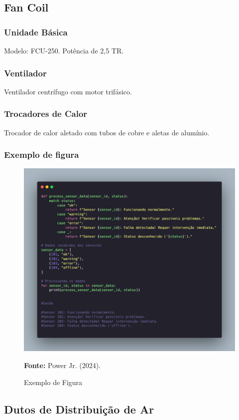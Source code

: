 \subsection{Fan Coil}
\subsubsection{Unidade Básica}
Modelo: FCU-250. Potência de 2,5 TR.

\subsubsection{Ventilador}
Ventilador centrífugo com motor trifásico.

\subsubsection{Trocadores de Calor}
Trocador de calor aletado com tubos de cobre e aletas de alumínio.


\subsubsection{Exemplo de figura}

\begin{figure}[h]
    \centering
    \includegraphics[width=12cm]{Figuras/carbon.png}
    \caption{Exemplo de Figura}
    \label{fig:exemplo_equipamento}
    \vskip 1mm
    \textbf{Fonte:} Power Jr. (2024).
\end{figure}

\subsection{Dutos de Distribuição de Ar}
